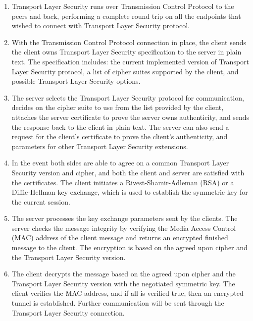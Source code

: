 \begin{enumerate}
\itemsep0em
\item Transport Layer Security runs over Transmission Control Protocol to the peers and back, performing a complete round trip on all the endpoints that wished to connect with Transport Layer Security protocol.

\item With the Transmission Control Protocol connection in place, the client sends the client owns Transport Layer Security specification to the server in plain text. The specification includes: the current implemented version of Transport Layer Security protocol,  a list of cipher suites supported by the client, and possible Transport Layer Security options.

\item The server selects the Transport Layer Security protocol for communication, decides on the cipher suite to use from the list provided by the client, attaches the server certificate to prove the server owns authenticity, and sends the response back to the client in plain text. The server can also send a request for the client's certificate to prove the client's authenticity, and parameters for other Transport Layer Security extensions.

\item In the event both sides are able to agree on a common Transport Layer Security version and cipher, and both the client and server are satisfied with the certificates. The client initiates a Rivest-Shamir-Adleman (RSA) or a Diffie-Hellman key exchange, which is used to establish the symmetric key for the current session. 
\item The server processes the key exchange parameters sent by the clients. The server checks the message integrity by verifying the Media Access Control (MAC) address of the client message and returns an encrypted finished message to the client. The encryption is based on the agreed upon cipher and the Transport Layer Security version.

\item The client decrypts the message based on the agreed upon cipher and the Transport Layer Security version with the negotiated symmetric key.  The client verifies the MAC address, and if all is verified true, then an encrypted tunnel is established. Further communication will be sent through the Transport Layer Security connection.
\cite{TLS}
\end{enumerate}

